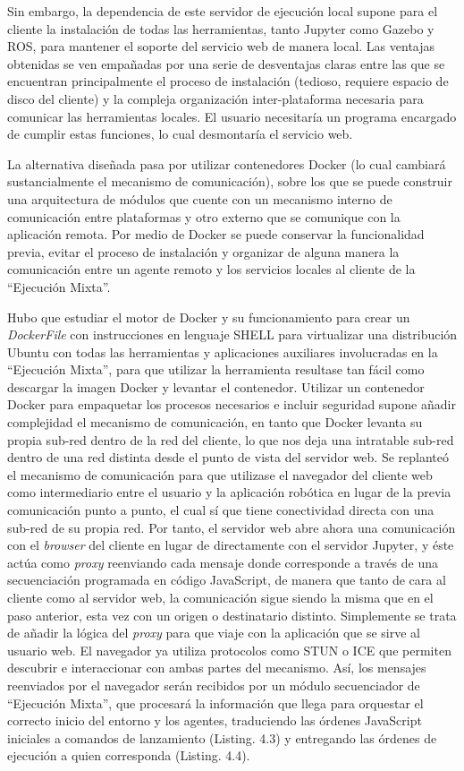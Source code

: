 Sin embargo, la dependencia de este servidor de ejecución local supone para el cliente la instalación de todas las herramientas, tanto Jupyter como Gazebo y ROS, para mantener el soporte del servicio web de manera local. Las ventajas obtenidas se ven empañadas por una serie de desventajas claras entre las que se encuentran principalmente el proceso de instalación (tedioso, requiere espacio de disco del cliente) y la compleja organización inter-plataforma necesaria para comunicar las herramientas locales. El usuario necesitaría un programa encargado de cumplir estas funciones, lo cual desmontaría el servicio web.

La alternativa diseñada pasa por utilizar contenedores Docker (lo cual cambiará sustancialmente el mecanismo de comunicación), sobre los que se puede construir una arquitectura de módulos que cuente con un mecanismo interno de comunicación entre plataformas y otro externo que se comunique con la aplicación remota. Por medio de Docker se puede conservar la funcionalidad previa, evitar el proceso de instalación y organizar de alguna manera la comunicación entre un agente remoto y los servicios locales al cliente de la ``Ejecución Mixta''.

Hubo que estudiar el motor de Docker y su funcionamiento para crear un \textit{DockerFile} con instrucciones en lenguaje SHELL para virtualizar una distribución Ubuntu con todas las herramientas y aplicaciones auxiliares involucradas en la ``Ejecución Mixta'', para que utilizar la herramienta resultase tan fácil como descargar la imagen Docker y levantar el contenedor. Utilizar un contenedor Docker para empaquetar los procesos necesarios e incluir seguridad supone añadir complejidad el mecanismo de comunicación, en tanto que Docker levanta su propia sub-red dentro de la red del cliente, lo que nos deja una intratable sub-red dentro de una red distinta desde el punto de vista del servidor web. Se replanteó el mecanismo de comunicación para que utilizase el navegador del cliente web como intermediario entre el usuario y la aplicación robótica en lugar de la previa comunicación punto a punto, el cual sí que tiene conectividad directa con una sub-red de su propia red. Por tanto, el servidor web abre ahora una comunicación con el \textit{browser} del cliente en lugar de directamente con el servidor Jupyter, y éste actúa como \textit{proxy} reenviando cada mensaje donde corresponde a través de una secuenciación programada en código JavaScript, de manera que tanto de cara al cliente como al servidor web, la comunicación sigue siendo la misma que en el paso anterior, esta vez con un origen o destinatario distinto. Simplemente se trata de añadir la lógica del \textit{proxy} para que viaje con la aplicación que se sirve al usuario web. El navegador ya utiliza protocolos como STUN o ICE que permiten descubrir e interaccionar con ambas partes del mecanismo. Así, los mensajes reenviados por el navegador serán recibidos por un módulo secuenciador de ``Ejecución Mixta'', que procesará la información que llega para orquestar el correcto inicio del entorno y los agentes, traduciendo las órdenes JavaScript iniciales a comandos de lanzamiento (Listing. 4.3) y entregando las órdenes de ejecución a quien corresponda (Listing. 4.4).

